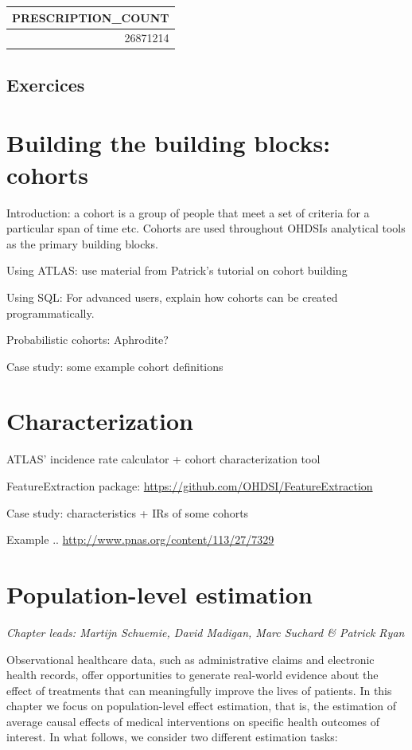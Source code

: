 \documentclass[11pt]{book}
\begin{document}
\begin{longtable}[]{@{}r@{}}
\toprule
PRESCRIPTION\_COUNT\tabularnewline
\midrule
\endhead
26871214\tabularnewline
\bottomrule
\end{longtable}

\section{Exercices}\label{exercices}

\chapter{Building the building blocks: cohorts}\label{Cohorts}

Introduction: a cohort is a group of people that meet a set of criteria
for a particular span of time etc. Cohorts are used throughout OHDSIs
analytical tools as the primary building blocks.

Using ATLAS: use material from Patrick's tutorial on cohort building

Using SQL: For advanced users, explain how cohorts can be created
programmatically.

Probabilistic cohorts: Aphrodite?

Case study: some example cohort definitions

\chapter{Characterization}\label{Characterization}

ATLAS' incidence rate calculator + cohort characterization tool

FeatureExtraction package:
\url{https://github.com/OHDSI/FeatureExtraction}

Case study: characteristics + IRs of some cohorts

Example .. \url{http://www.pnas.org/content/113/27/7329}

\chapter{Population-level estimation}\label{PopulationLevelEstimation}

\emph{Chapter leads: Martijn Schuemie, David Madigan, Marc Suchard \&
Patrick Ryan}

Observational healthcare data, such as administrative claims and
electronic health records, offer opportunities to generate real-world
evidence about the effect of treatments that can meaningfully improve
the lives of patients. In this chapter we focus on population-level
effect estimation, that is, the estimation of average causal effects of
medical interventions on specific health outcomes of interest. In what
follows, we consider two different estimation tasks:
\end{document}
